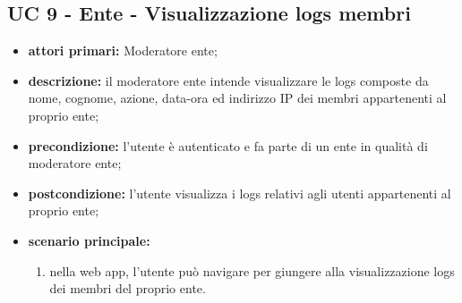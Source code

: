 		\subsection{UC 9 - Ente - Visualizzazione logs membri}
		\begin{itemize}
			\item \textbf{attori primari:} Moderatore ente;
			\item \textbf{descrizione:} il moderatore ente intende visualizzare le logs composte da nome, cognome, azione, data-ora ed indirizzo IP dei membri appartenenti al proprio ente;
			\item \textbf{precondizione:} l'utente è autenticato e fa parte di un ente in qualità di moderatore ente;
			\item \textbf{postcondizione:} l'utente visualizza i logs relativi agli utenti appartenenti al proprio ente;
			\item \textbf{scenario principale:}
			\begin{enumerate}
				\item nella web app, l'utente può navigare per giungere alla visualizzazione logs dei membri del proprio ente.
			\end{enumerate}	
		\end{itemize}

